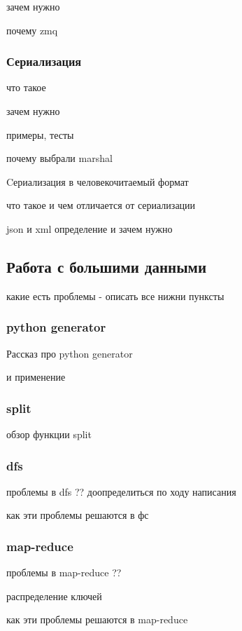 \documentclass[12pt,a4paper,oneside]{extarticle}
\begin{document}
            зачем нужно

            почему zmq

        \subsubsection{Сериализация}
            что такое

            зачем нужно

            примеры, тесты

            почему выбрали marshal

            Cериализация в человекочитаемый формат %

            что такое и чем отличается от сериализации

            json и xml определение и зачем нужно

    \clearpage

    \subsection{Работа с большими данными}

        какие есть проблемы - описать все нижни пунксты

        \subsubsection{python generator}
            Рассказ про python generator

            и применение

        \subsubsection{split}
            обзор функции split

        \subsubsection{dfs}
            проблемы в dfs ?? доопределиться по ходу написания

            как эти проблемы решаются в фс
        \subsubsection{map-reduce}
            проблемы в map-reduce ??

            распределение ключей

            как эти проблемы решаются в map-reduce
    \clearpage 
\end{document}
